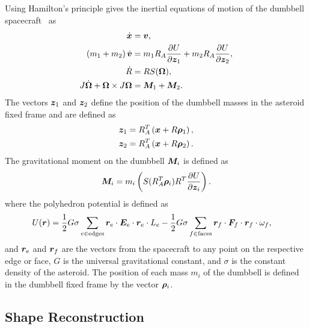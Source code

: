\documentclass[letterpaper, paper,11pt]{AAS}		%
\begin{document}
Using Hamilton's principle gives the inertial equations of motion of the dumbbell spacecraft~\cite{kulumani2017b} as
\begin{align}
    \dot{\bm{x}} &= \bm{v}, \\
    \left( m_1 + m_2 \right) \dot{\bm{v}} &= m_1 R_A \frac{\partial U}{\partial \bm{z}_1} + m_2 R_A \frac{\partial U}{\partial \bm{z}_2}, \\
    \dot{R} &= R S(\bm{\Omega}) , \\
    J \dot{\bm{\Omega}} + \bm{\Omega} \times J \bm{\Omega} &= \bm{M}_1 + \bm{M}_2.
\end{align}
The vectors \( \bm{z}_1 \) and \( \bm{z}_2\) define the position of the dumbbell masses in the asteroid fixed frame and are defined as
\begin{align}
    \bm{z}_1 &= R_A^T \left( \bm{x} + R \bm{\rho}_1 \right) , \\
    \bm{z}_2 &= R_A^T \left( \bm{x} + R \bm{\rho}_2 \right).
\end{align}
The gravitational moment on the dumbbell \( \bm{M}_i\) is defined as
\begin{align}
    \bm{M}_i = m_i \left( S(R_A^T \bm{\rho}_i) R^T \frac{\partial U}{\partial \bm{z}_i} \right).
\end{align}
where the polyhedron potential is defined as 
\begin{align}
    U(\bm{r}) &= \frac{1}{2} G \sigma \sum_{e \in \text{edges}} \bm{r}_e \cdot \bm{E}_e \cdot \bm{r}_e \cdot L_e - \frac{1}{2}G \sigma \sum_{f \in \text{faces}} \bm{r}_f \cdot \bm{F}_f \cdot \bm{r}_f \cdot \omega_f,
\end{align}
and \( \bm{r}_e\) and \(\bm{r}_f \) are the vectors from the spacecraft to any point on the respective edge or face, \( G\) is the universal gravitational constant, and \( \sigma \) is the constant density of the asteroid.
The position of each mass \(m_i\) of the dumbbell is defined in the dumbbell fixed frame by the vector \(\bm{\rho}_i\). 

\subsection{Shape Reconstruction}
\end{document}
